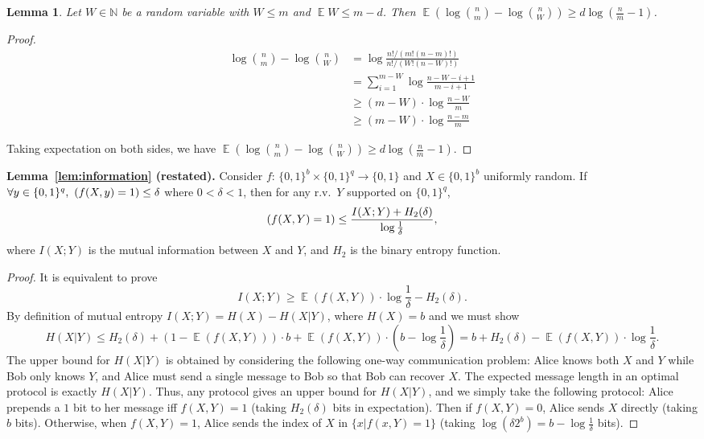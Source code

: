 \documentclass[11pt]{article}
\newtheorem{lemma}{Lemma}
\DeclareMathOperator*{\E}{\mathbb{E}}
\let\Pr\relax
\DeclareMathOperator*{\Pr}{\mathbb{P}}
\begin{document}
\begin{lemma} \label{lemma:bits-saving}
Let $W\in \mathbb{N}$ be a random variable with $W\le m$ and $\E W\le m-d$. Then $\E(\log {n \choose m}-\log {n \choose W})\ge d \log (\frac{n}{m}-1)$.
\end{lemma}

\begin{proof}
  \begin{align*}
  \log {n \choose m}-\log {n \choose W}
  &= \log \frac{n!/(m!(n-m)!)}{n!/(W!(n-W)!)} \\
  &= \sum_{i=1}^{m-W}\log \frac{n-W-i+1}{m-i+1} \\
  &\ge (m-W)\cdot \log \frac{n-W}{m} \\
  &\ge (m-W)\cdot \log \frac{n-m}{m}
  \end{align*}
  
  Taking expectation on both sides, we have $\E(\log {n \choose m}-\log {n \choose W})\ge d \log (\frac{n}{m}-1)$. 
\end{proof}

\noindent \textbf{Lemma~\ref{lem:information} (restated).}
  Consider $f$: $\{0,1\}^b\times \{0,1\}^q\rightarrow \{0,1\}$ and $X\in\{0,1\}^b$ uniformly random. If $\forall y\in \{0,1\}^q,\ \Pr(f(X,y)=1)\le \delta$ where $0<\delta<1$, then for any r.v.\ $Y$ supported on $\{0,1\}^q$,
$$
  \Pr(f(X,Y)=1)\le \frac{I(X;Y)+H_2(\delta)}{\log \frac{1}{\delta}} ,
$$
  where $I(X;Y)$ is the mutual information between $X$ and $Y$, and $H_2$ is the binary entropy function.
\begin{proof}
  It is equivalent to prove 
$$I(X;Y)\ge \E(f(X,Y))\cdot \log\frac{1}{\delta}-H_2(\delta).$$
By definition of mutual entropy $I(X;Y)=H(X)-H(X|Y)$, where $H(X)=b$ and we must show
$$H(X|Y)\le H_2(\delta)+(1-\E(f(X,Y)))\cdot b+\E(f(X,Y))\cdot (b-\log\frac{1}{\delta})=b+H_2(\delta)-\E(f(X,Y))\cdot \log\frac{1}{\delta} .$$
  The upper bound for $H(X|Y)$ is obtained by considering the following one-way communication problem: Alice knows both $X$ and $Y$ while Bob only knows $Y$, and Alice must send a single message to Bob so that Bob can recover $X$. The expected message length in an optimal protocol is exactly $H(X|Y)$.  Thus, any protocol gives an upper bound for $H(X|Y)$, and we simply take the following protocol: Alice prepends a $1$ bit to her message iff $f(X,Y) = 1$ (taking $H_2(\delta)$ bits in expectation). Then if $f(X,Y)=0$, Alice sends $X$ directly (taking $b$ bits). Otherwise, when $f(X,Y)=1$, Alice sends the index of $X$ in $\{x|f(x,Y)=1\}$ (taking $\log (\delta 2^b)=b-\log\frac{1}{\delta}$ bits).  
\end{proof}
\end{document}
